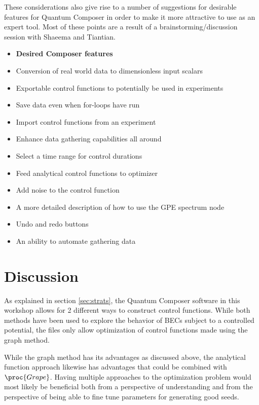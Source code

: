 \documentclass[a4paper, twocolumn]{revtex4-1}
\begin{document}
These considerations also give rise to a number of suggestions for desirable features for Quantum Composer in order to make it more attractive to use as an expert tool. Most of these points are a result of a brainstorming/discussion session with Shaeema and Tiantian.

\begin{itemize}
	\item[] \textbf{Desired Composer features} 
	\item Conversion of real world data to dimensionless input scalars
	\item Exportable control functions to potentially be used in experiments
	\item Save data even when for-loops have run
	\item Import control functions from an experiment
	\item Enhance data gathering capabilities all around
	\item Select a time range for control durations
	\item Feed analytical control functions to  optimizer
	\item Add noise to the control function
	\item A more detailed description of how to use the GPE spectrum node
	\item Undo and redo buttons
	\item An ability to automate gathering data
\end{itemize}

\section{Discussion}\label{sec:discussion}
As explained in section \ref{sec:strats}, the Quantum Composer software in this workshop allows for 2 different ways to construct control functions. While both methods have been used to explore the behavior of BECs subject to a controlled potential, the files only allow optimization of control functions made using the graph method.

While the graph method has its advantages as discussed above, the analytical function approach likewise has advantages that could be combined with $\proc{Grape}$. Having multiple approaches to the optimization problem would most likely be beneficial both from a perspective of understanding and from the perspective of being able to fine tune parameters for generating good seeds.\\
\end{document}
